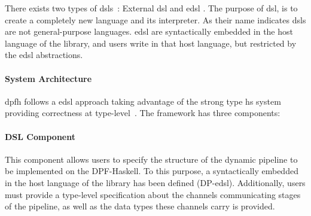 There exists two types of \acrlong{dsl}s~\cite{dsl}: External \acrfull{dsl} and \acrfull{edsl} \cite{dsel}. The purpose of \acrshort{dsl}, is to create a completely new language and its interpreter. As their name indicates \acrshort{dsl}s are not general-purpose languages.  \acrshort{edsl} are syntactically embedded in the host language of the library, and users write in that host language, but restricted by the \acrshort{edsl} abstractions. 

\paragraph{System Architecture} 
\acrshort{dpfh} follows a \acrshort{edsl} approach taking advantage of the strong type \acrshort{hs} system providing correctness at type-level~\cite{curryhoward}. The framework has three components:  %

\paragraph{DSL Component} This component allows users to specify the structure of the dynamic pipeline to be implemented on the DPF-Haskell. To this purpose, a syntactically embedded in the host language of the library  has been defined (DP-\acrshort{edsl}).  Additionally, users must provide a type-level specification about the channels communicating stages of the pipeline, as well as the data types these channels carry is provided.
%
\iffalse
